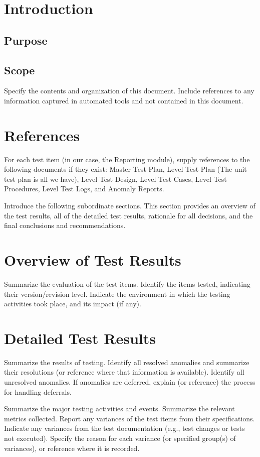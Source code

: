 \section{Introduction}

\subsection{Purpose}

\subsection{Scope}
Specify the contents and organization of this document. Include references to any information captured
in automated tools and not contained in this document.

\section{References}
For each test item (in our case, the Reporting module), supply references to the following documents if they exist: Master Test
Plan, Level Test Plan (The unit test plan is all we have), Level Test Design, Level Test Cases, Level Test Procedures, Level Test Logs,
and Anomaly Reports.

Introduce the following subordinate sections. This section provides an overview of the test results, all
of the detailed test results, rationale for all decisions, and the final conclusions and recommendations.

\section{Overview of Test Results}
Summarize the evaluation of the test items. Identify the items tested, indicating their version/revision
level. Indicate the environment in which the testing activities took place, and its impact (if any).

\section{Detailed Test Results}
Summarize the results of testing. Identify all resolved anomalies and summarize their resolutions (or
reference where that information is available). Identify all unresolved anomalies. If anomalies are
deferred, explain (or reference) the process for handling deferrals.\par

Summarize the major testing activities and events. Summarize the relevant metrics collected.
Report any variances of the test items from their specifications. Indicate any variances from the test
documentation (e.g., test changes or tests not executed). Specify the reason for each variance (or
specified group(s) of variances), or reference where it is recorded.\par

